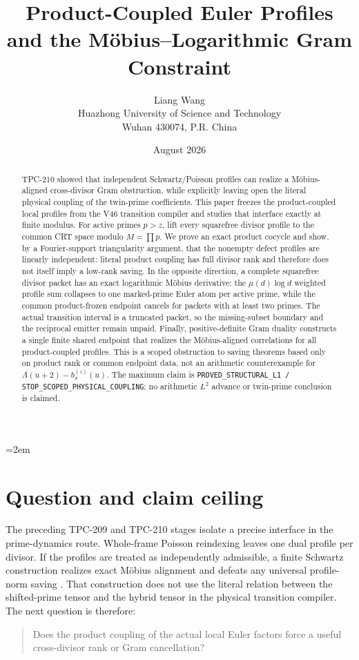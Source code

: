 \documentclass[11pt]{article}
\title{\textbf{Product-Coupled Euler Profiles\\
and the M\"obius--Logarithmic Gram Constraint}}
\author{Liang Wang\\
Huazhong University of Science and Technology\\
Wuhan 430074, P.R. China}
\date{August 2026}
\begin{document}
\emergencystretch=2em
\maketitle

\begin{abstract}
TPC-210 showed that independent Schwartz/Poisson profiles can realize a
M\"obius-aligned cross-divisor Gram obstruction, while explicitly leaving open
the literal physical coupling of the twin-prime coefficients.  This paper
freezes the product-coupled local profiles from the V46 transition compiler
and studies that interface exactly at finite modulus.  For active primes
$p>z$, lift every squarefree divisor profile to the common CRT space modulo
$M=\prod p$.  We prove an exact product cocycle and show, by a Fourier-support
triangularity argument, that the nonempty defect profiles are linearly
independent: literal product coupling has full divisor rank and therefore does
not itself imply a low-rank saving.  In the opposite direction, a complete
squarefree divisor packet has an exact logarithmic M\"obius derivative: the
$\mu(d)\log d$ weighted profile sum collapses to one marked-prime Euler atom
per active prime, while the common product-frozen endpoint cancels for packets
with at least two primes.  The actual transition interval is a truncated
packet, so the missing-subset boundary and the reciprocal emitter remain
unpaid.  Finally, positive-definite Gram duality constructs a single finite
shared endpoint that realizes the M\"obius-aligned correlations for all
product-coupled profiles.  This is a scoped obstruction to saving theorems
based only on product rank or common endpoint data, not an arithmetic
counterexample for $\Lambda(u+2)-b_x^{(z)}(u)$.  The maximum claim is
\texttt{PROVED\_STRUCTURAL\_L1 / STOP\_SCOPED\_PHYSICAL\_COUPLING}; no
arithmetic $L^2$ advance or twin-prime conclusion is claimed.
\end{abstract}

\section{Question and claim ceiling}

The preceding TPC-209 and TPC-210 stages isolate a precise interface in the
prime-dynamics route.  Whole-frame Poisson reindexing leaves one dual profile
per divisor.  If the profiles are treated as independently admissible, a
finite Schwartz construction realizes exact M\"obius alignment and defeats any
universal profile-norm saving \cite{WangTPC209,WangTPC210}.  That construction
does not use the literal relation between the shifted-prime tensor and the
hybrid tensor in the physical transition compiler.  The next question is
therefore:
\begin{quote}
Does the product coupling of the actual local Euler factors force a useful
cross-divisor rank or Gram cancellation?
\end{quote}
\end{document}
